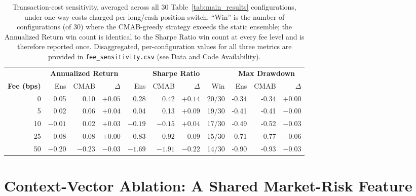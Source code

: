 \documentclass[pdflatex,sn-mathphys-num]{sn-jnl}
\theoremstyle{thmstyleone}%
\theoremstyle{thmstyletwo}%
\theoremstyle{thmstylethree}%
\begin{document}
\begin{appendices}
\begin{table}[htbp]
    \centering
    \caption{Transaction-cost sensitivity, averaged across all 30 Table~\ref{tab:main_results} configurations, under one-way costs charged per long/cash position switch. ``Win'' is the number of configurations (of 30) where the CMAB-greedy strategy exceeds the static ensemble; the Annualized Return win count is identical to the Sharpe Ratio win count at every fee level and is therefore reported once. Disaggregated, per-configuration values for all three metrics are provided in \texttt{fee\_sensitivity.csv} (see Data and Code Availability).}
    \label{tab:fee-sensitivity}
    \setlength{\tabcolsep}{3pt}
    \scriptsize
    \begin{tabular}{@{} r rrr rrrr rrr @{}}
    \toprule
     & \multicolumn{3}{c}{\textbf{Annualized Return}} & \multicolumn{4}{c}{\textbf{Sharpe Ratio}} & \multicolumn{3}{c}{\textbf{Max Drawdown}} \\
    \cmidrule(lr){2-4} \cmidrule(lr){5-8} \cmidrule(lr){9-11}
    \textbf{Fee (bps)} & Ens & CMAB & $\Delta$ & Ens & CMAB & $\Delta$ & Win & Ens & CMAB & $\Delta$ \\
    \midrule
    0  & 0.05 & 0.10 & $+0.05$ & 0.28  & 0.42  & $+0.14$  & 20/30 & -0.34 & -0.34 & $+0.00$ \\
    5  & 0.02 & 0.06 & $+0.04$ & 0.04  & 0.13  & $+0.09$  & 19/30 & -0.41 & -0.41 & $-0.00$ \\
    10 & $-0.01$ & 0.02 & $+0.03$ & $-0.19$ & $-0.15$ & $+0.04$  & 17/30 & -0.49 & -0.52 & $-0.03$ \\
    25 & $-0.08$ & $-0.08$ & $+0.00$ & $-0.83$ & $-0.92$ & $-0.09$  & 15/30 & -0.71 & -0.77 & $-0.06$ \\
    50 & $-0.20$ & $-0.23$ & $-0.03$ & $-1.69$ & $-1.91$ & $-0.22$  & 14/30 & -0.90 & -0.93 & $-0.03$ \\
    \bottomrule
    \end{tabular}
\end{table}

\section{Context-Vector Ablation: A Shared Market-Risk Feature}
\label{sec:ablation}


\end{appendices}
\end{document}
